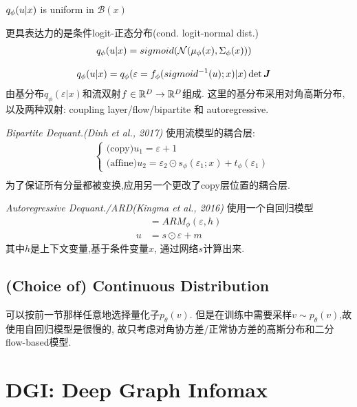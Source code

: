 \documentclass{article}
\begin{document}
     $q_\phi(u|x)$ is uniform in $\mathcal B(x)$

     更具表达力的是条件logit-正态分布(cond. logit-normal dist.)
    \begin{align}
        &q_\phi(u|x) = sigmoid(\mathcal{N}(\mu_\phi(x), \Sigma_\phi(x)))
    \end{align}

    \begin{align}
        &q_\phi(u|x) = q_\phi(\varepsilon = f_\phi(sigmoid^{-1}(u);x)|x)\det \boldsymbol{J}
    \end{align}
    由基分布$q_\phi(\varepsilon|x)$和流双射$f\in \mathbb{R}^D\to \mathbb{R}^D$组成. 这里的基分布采用对角高斯分布, 以及两种双射: coupling layer/flow/bipartite 和 autoregressive.
    
    \textit{Bipartite Dequant.(Dinh et al., 2017)} 使用流模型的耦合层:
    \begin{align}
        &\begin{cases}
            \text{(copy)} u_1 = \varepsilon+1\\
            \text{(affine)} u_2 = \varepsilon_2 \odot s_\phi(\varepsilon_1; x) + t_\phi(\varepsilon_1)
        \end{cases}\\
    \end{align}
    为了保证所有分量都被变换,应用另一个更改了copy层位置的耦合层.

    \textit{Autoregressive Dequant./ARD(Kingma et al., 2016)} 使用一个自回归模型
    \begin{align}
        [m, s] &= ARM_\phi(\varepsilon, h)\\
        u &= s\odot \varepsilon + m
    \end{align}
    其中$h$是上下文变量,基于条件变量$x$, 通过网络$s$计算出来.

\subsection{(Choice of) Continuous Distribution}

    可以按前一节那样任意地选择量化子$p_\theta(v)$. 但是在训练中需要采样$v\sim p_\theta(v)$,故使用自回归模型是很慢的, 故只考虑对角协方差/正常协方差的高斯分布和二分flow-based模型.


\section{DGI: Deep Graph Infomax}
\end{document}
